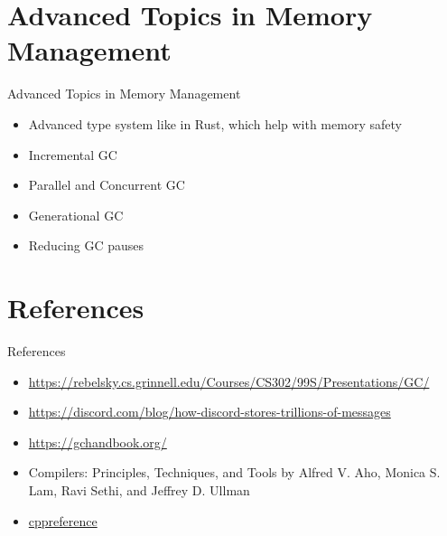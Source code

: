 \documentclass[
  10pt,
  ignorenonframetext,
]{beamer}
\providecommand{\tightlist}{%
  \setlength{\itemsep}{0pt}\setlength{\parskip}{0pt}}
\begin{document}
\hypertarget{advanced-topics-in-memory-management}{%
\section{Advanced Topics in Memory
Management}\label{advanced-topics-in-memory-management}}

\begin{frame}{Advanced Topics in Memory
Management}
\pause

\begin{itemize}
\tightlist
\item
  Advanced type system like in Rust, which help
  with memory safety
\end{itemize}

\pause

\begin{itemize}
\tightlist
\item
  Incremental GC
\end{itemize}

\pause

\begin{itemize}
\tightlist
\item
  Parallel and Concurrent GC
\end{itemize}

\pause

\begin{itemize}
\tightlist
\item
  Generational GC
\end{itemize}

\pause

\begin{itemize}
\tightlist
\item
  Reducing GC pauses
\end{itemize}
\end{frame}

\hypertarget{references}{%
\section{References}\label{references}}

\begin{frame}{References}
\begin{itemize}
\tightlist
\item
  \url{https://rebelsky.cs.grinnell.edu/Courses/CS302/99S/Presentations/GC/}
\item
  \url{https://discord.com/blog/how-discord-stores-trillions-of-messages}
\item
  \url{https://gchandbook.org/}
\item
  Compilers: Principles, Techniques, and Tools by
  Alfred V. Aho, Monica S. Lam, Ravi Sethi, and
  Jeffrey D. Ullman
\item
  \href{https://en.cppreference.com/w/}{cppreference}
\end{itemize}
\end{frame}
\end{document}
